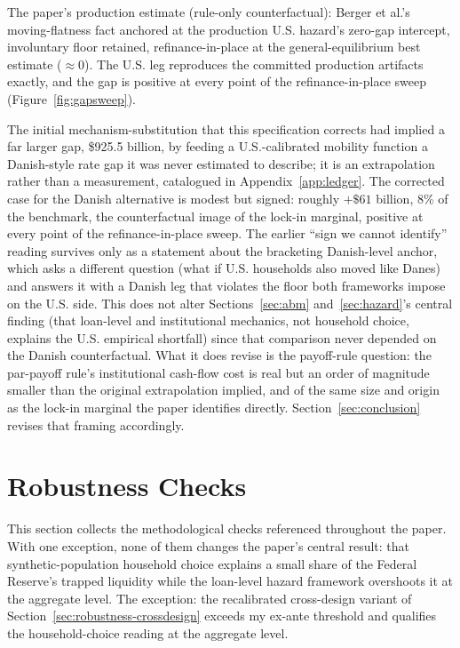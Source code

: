 \documentclass[12pt]{article}
\begin{document}
\begin{table}[H]
\begin{threeparttable}
\begin{tablenotes}[flushleft]
\item[d] The paper's production estimate (rule-only counterfactual): Berger et al.'s moving-flatness fact anchored at the production U.S. hazard's zero-gap intercept, involuntary floor retained, refinance-in-place at the general-equilibrium best estimate ($\approx$0). The U.S. leg reproduces the committed production artifacts exactly, and the gap is positive at every point of the refinance-in-place sweep (Figure~\ref{fig:gapsweep}).
\end{tablenotes}
\end{threeparttable}
\end{table}

The initial mechanism-substitution that this specification corrects had implied a far larger gap, \$925.5 billion, by feeding a U.S.-calibrated mobility function a Danish-style rate gap it was never estimated to describe; it is an extrapolation rather than a measurement, catalogued in Appendix~\ref{app:ledger}. The corrected case for the Danish alternative is modest but signed: roughly $+\$61$ billion, 8\% of the benchmark, the counterfactual image of the lock-in marginal, positive at every point of the refinance-in-place sweep. The earlier ``sign we cannot identify'' reading survives only as a statement about the bracketing Danish-level anchor, which asks a different question (what if U.S. households also moved like Danes) and answers it with a Danish leg that violates the floor both frameworks impose on the U.S. side. This does not alter Sections~\ref{sec:abm} and~\ref{sec:hazard}'s central finding (that loan-level and institutional mechanics, not household choice, explains the U.S. empirical shortfall) since that comparison never depended on the Danish counterfactual. What it does revise is the payoff-rule question: the par-payoff rule's institutional cash-flow cost is real but an order of magnitude smaller than the original extrapolation implied, and of the same size and origin as the lock-in marginal the paper identifies directly. Section~\ref{sec:conclusion} revises that framing accordingly.

\section{Robustness Checks}\label{sec:robustness}

This section collects the methodological checks referenced throughout the paper. With one exception, none of them changes the paper's central result: that synthetic-population household choice explains a small share of the Federal Reserve's trapped liquidity while the loan-level hazard framework overshoots it at the aggregate level. The exception: the recalibrated cross-design variant of Section~\ref{sec:robustness-crossdesign} exceeds my ex-ante threshold and qualifies the household-choice reading at the aggregate level.
\end{document}
